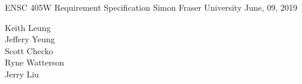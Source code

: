 
\thispagestyle{empty}
\begin{titlepage}
  \null\vfill

  \begin{center}

  {\Huge ENSC 405W }
  \vskip 1cm
  {\Huge Requirement Specification }
  \vskip 1cm
  {\LARGE Simon Fraser University}
  \vskip 0.5cm
  {\LARGE June, 09, 2019}
  \end{center}

  \vfill
  \vfill
  \vfill

  \begin{flushright}
  Keith Leung\\
  Jeffery Yeung\\
  Scott Checko\\
  Ryne Watterson\\
  Jerry Liu\\
\end{flushright}
\end{titlepage}

